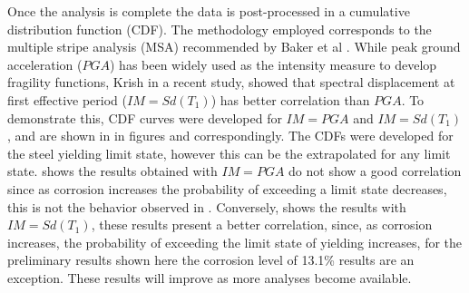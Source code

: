 Once the analysis is complete the data is post-processed in a cumulative distribution function (CDF). The methodology employed corresponds to the multiple stripe analysis (MSA) recommended by Baker et al \cite{Baker2015}. While peak ground acceleration ($PGA$) has been widely used as the intensity measure to develop fragility functions\cite{Ghosh2015}\cite{Bisadi2015}\cite{Shekhar2018}, Krish \cite{Krish2018} in a recent study, showed that spectral displacement at first effective period ($IM=Sd(T_1)$) has better correlation than $PGA$. To demonstrate this, CDF curves were developed for $IM=PGA$ and $IM=Sd(T_1)$, and are shown in in figures  and  correspondingly. The CDFs were developed for the steel yielding limit state, however this can be the extrapolated for any limit state.  shows the results obtained with $IM=PGA$ do not show a good correlation since as corrosion increases the probability of exceeding a limit state decreases, this is not the behavior observed in . Conversely,  shows the results with $IM=Sd(T_1)$, these results present a better correlation, since, as corrosion increases, the probability of exceeding the limit state of yielding increases, for the preliminary results shown here the corrosion level of 13.1\% results are an exception. These results will improve as more analyses become available. 

